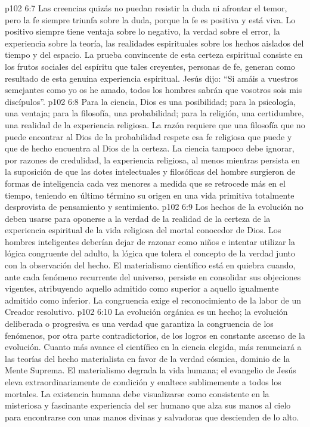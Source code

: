 \vs p102 6:7 Las creencias quizás no puedan resistir la duda ni afrontar el temor, pero la fe siempre triunfa sobre la duda, porque la fe es positiva y está viva. Lo positivo siempre tiene ventaja sobre lo negativo, la verdad sobre el error, la experiencia sobre la teoría, las realidades espirituales sobre los hechos aislados del tiempo y del espacio. La prueba convincente de esta certeza espiritual consiste en los frutos sociales del espíritu que tales creyentes, personas de fe, generan como resultado de esta genuina experiencia espiritual. Jesús dijo: “Si amáis a vuestros semejantes como yo os he amado, todos los hombres sabrán que vosotros sois mis discípulos”.
\vs p102 6:8 \pc Para la ciencia, Dios es una posibilidad; para la psicología, una ventaja; para la filosofía, una probabilidad; para la religión, una certidumbre, una realidad de la experiencia religiosa. La razón requiere que una filosofía que no puede encontrar al Dios de la probabilidad respete esa fe religiosa que puede y que de hecho encuentra al Dios de la certeza. La ciencia tampoco debe ignorar, por razones de credulidad, la experiencia religiosa, al menos mientras persista en la suposición de que las dotes intelectuales y filosóficas del hombre surgieron de formas de inteligencia cada vez menores a medida que se retrocede más en el tiempo, teniendo en último término su origen en una vida primitiva totalmente desprovista de pensamiento y sentimiento.
\vs p102 6:9 Los hechos de la evolución no deben usarse para oponerse a la verdad de la realidad de la certeza de la experiencia espiritual de la vida religiosa del mortal conocedor de Dios. Los hombres inteligentes deberían dejar de razonar como niños e intentar utilizar la lógica congruente del adulto, la lógica que tolera el concepto de la verdad junto con la observación del hecho. El materialismo científico está en quiebra cuando, ante cada fenómeno recurrente del universo, persiste en consolidar sus objeciones vigentes, atribuyendo aquello admitido como superior a aquello igualmente admitido como inferior. La congruencia exige el reconocimiento de la labor de un Creador resolutivo.
\vs p102 6:10 La evolución orgánica es un hecho; la evolución deliberada o progresiva es una verdad que garantiza la congruencia de los fenómenos, por otra parte contradictorios, de los logros en constante ascenso de la evolución. Cuanto más avance el científico en la ciencia elegida, más renunciará a las teorías del hecho materialista en favor de la verdad cósmica, dominio de la Mente Suprema. El materialismo degrada la vida humana; el evangelio de Jesús eleva extraordinariamente de condición y enaltece sublimemente a todos los mortales. La existencia humana debe visualizarse como consistente en la misteriosa y fascinante experiencia del ser humano que alza sus manos al cielo para encontrarse con unas manos divinas y salvadoras que descienden de lo alto.
